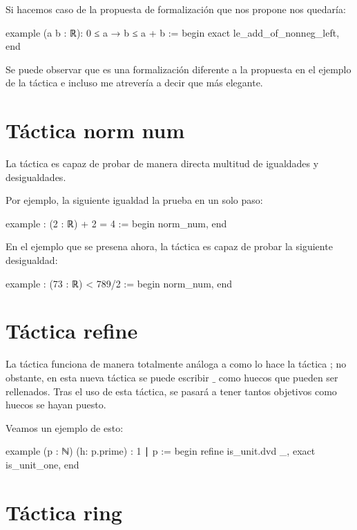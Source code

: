 Si hacemos caso de la propuesta de formalización que nos propone nos quedaría:

\begin{leancode}
example (a b : ℝ): 0 ≤ a → b ≤ a + b :=
begin
  exact le_add_of_nonneg_left,
end
\end{leancode}

Se puede observar que es una formalización diferente a la propuesta en
el ejemplo de la táctica  e incluso me
atrevería a decir que más elegante.

\section{Táctica norm num}

La táctica  es capaz de probar de manera
directa multitud de igualdades y desigualdades.

Por ejemplo, la siguiente igualdad la prueba en un solo paso:

\begin{leancode}
example : (2 : ℝ) + 2 = 4 :=
begin
  norm_num,
end
\end{leancode}

En el ejemplo que se presena ahora, la táctica  es
capaz de probar la siguiente desigualdad:
\begin{leancode}
example : (73 : ℝ) < 789/2 :=
begin
  norm_num,
end
\end{leancode}

\section{Táctica refine}

La táctica  funciona de manera totalmente
análoga a como lo hace la táctica ; no obstante,
en esta nueva táctica se puede escribir \(\_\) como huecos que pueden
ser rellenados. Tras el uso de esta táctica, se pasará a tener tantos
objetivos como huecos se hayan puesto.

Veamos un ejemplo de esto:

\begin{leancode}
example (p : ℕ) (h: p.prime) : 1 ∣ p :=
begin
  refine is_unit.dvd _,
  exact is_unit_one,
end
\end{leancode}

\section{Táctica ring}

